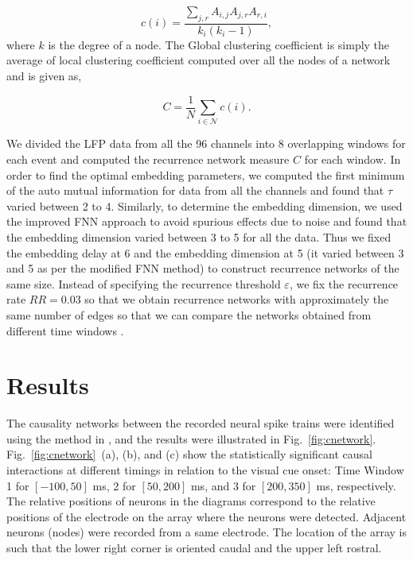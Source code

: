 \documentclass[a4paper]{jpconf}
\begin{document}
\begin{equation}
c(i)=\frac{\sum_{j,r}A_{i,j}A_{j,r}A_{r,i}}{k_{i}(k_{i}-1)},
\end{equation}
where $k$ is the degree of a node. The Global clustering coefficient is simply the average of local clustering coefficient computed over all the nodes of a network and is given as,

\begin{equation}
C= \frac{1}{N}\sum_{i\in\mathcal{N}}c(i).
\end{equation}


We divided the LFP data from all the 96 channels into 8 overlapping windows for each event and computed the recurrence network measure $C$ for each window. In order to find the optimal embedding parameters, we computed the first minimum of the auto mutual information for data from all the channels and found that $\tau$ varied between 2 to 4. Similarly, to determine the embedding dimension, we used the improved FNN approach \cite{hegger1999improved} to avoid spurious effects due to noise and found that the embedding dimension varied between 3 to 5 for all the data. Thus we fixed the embedding delay at 6 and the embedding dimension at 5 (it varied between 3 and 5 as per the modified FNN method) to construct recurrence networks of the same size. Instead of specifying the recurrence threshold $\varepsilon$, we fix the recurrence rate $RR = 0.03$ so that we obtain recurrence networks with approximately the same number of edges so that we can compare the networks obtained from different time windows \cite{donner2011recurrence}. 

\section{Results}
\label{sec:results}

The causality networks between the recorded neural spike trains
were identified using the method in \cite{ref:Sanggyun}, and the
results were illustrated in Fig.~\ref{fig:cnetwork}.
Fig.~\ref{fig:cnetwork}~(a), (b), and (c) show the statistically
significant causal interactions at different timings in relation
to the visual cue onset: Time Window 1 for $[-100, 50]$ ms, 2 for
$[50, 200]$ ms, and 3 for $[200, 350]$ ms, respectively. The
relative positions of neurons in the diagrams correspond to the
relative positions of the electrode on the array where the neurons
were detected. Adjacent neurons (nodes) were recorded from a same
electrode. The location of the array is such that the lower right
corner is oriented caudal and the upper left rostral.
\end{document}
